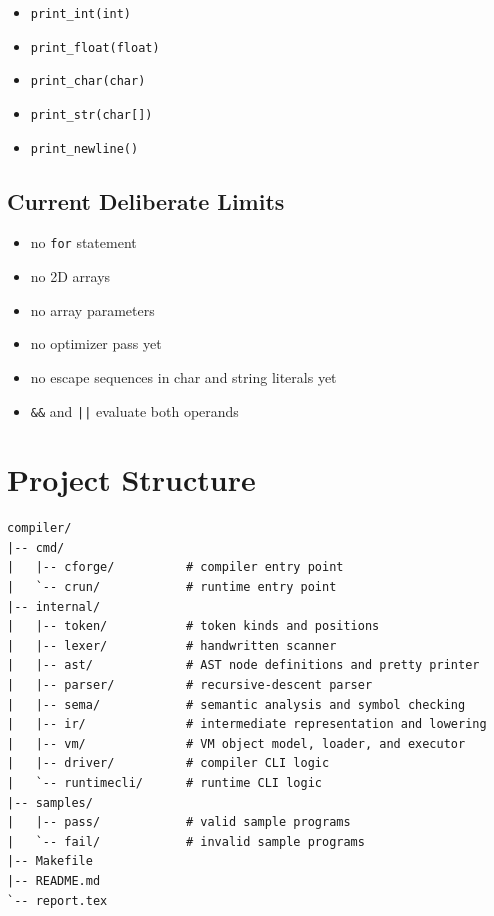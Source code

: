 \documentclass[11pt,a4paper]{article}
\begin{document}
\begin{itemize}[leftmargin=2em]
    \item \texttt{print\_int(int)}
    \item \texttt{print\_float(float)}
    \item \texttt{print\_char(char)}
    \item \texttt{print\_str(char[])}
    \item \texttt{print\_newline()}
\end{itemize}

\subsection*{Current Deliberate Limits}

\begin{itemize}[leftmargin=2em]
    \item no \texttt{for} statement
    \item no 2D arrays
    \item no array parameters
    \item no optimizer pass yet
    \item no escape sequences in char and string literals yet
    \item \texttt{\&\&} and \texttt{||} evaluate both operands
\end{itemize}

\section{Project Structure}

\begin{lstlisting}
compiler/
|-- cmd/
|   |-- cforge/          # compiler entry point
|   `-- crun/            # runtime entry point
|-- internal/
|   |-- token/           # token kinds and positions
|   |-- lexer/           # handwritten scanner
|   |-- ast/             # AST node definitions and pretty printer
|   |-- parser/          # recursive-descent parser
|   |-- sema/            # semantic analysis and symbol checking
|   |-- ir/              # intermediate representation and lowering
|   |-- vm/              # VM object model, loader, and executor
|   |-- driver/          # compiler CLI logic
|   `-- runtimecli/      # runtime CLI logic
|-- samples/
|   |-- pass/            # valid sample programs
|   `-- fail/            # invalid sample programs
|-- Makefile
|-- README.md
`-- report.tex
\end{lstlisting}
\end{document}
